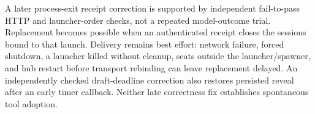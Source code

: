 A later process-exit receipt correction is supported by independent fail-to-pass HTTP and launcher-order checks, not a repeated model-outcome trial. Replacement becomes possible when an authenticated receipt closes the sessions bound to that launch. Delivery remains best effort: network failure, forced shutdown, a launcher killed without cleanup, seats outside the launcher/spawner, and hub restart before transport rebinding can leave replacement delayed. An independently checked draft-deadline correction also restores persisted reveal after an early timer callback. Neither late correctness fix establishes spontaneous tool adoption.
